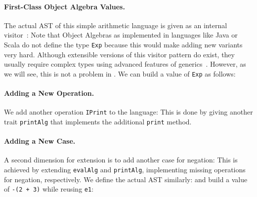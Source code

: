 \paragraph{First-Class Object Algebra Values.}
The actual AST of this simple arithmetic language is given as an internal
visitor~\cite{Oliveira_2008}:
Note that Object Algebras as implemented in languages like Java or Scala do not define the type
\lstinline{Exp} because this would make adding new variants very hard. Although extensible versions
of this visitor pattern do exist, they usually require complex types using advanced features of
generics~\cite{oliveira2012extensibility, togersen:2004}.
However, as we will see, this is not a problem in \sedel. We can build a value of \lstinline{Exp} as follows:


\paragraph{Adding a New Operation.}
We add another operation \lstinline{IPrint} to the language:
This is done by giving another trait \lstinline{printAlg} that implements the
additional \lstinline{print} method.


\paragraph{Adding a New Case.}
A second dimension for extension is to add another case for negation:
This is achieved by extending \lstinline{evalAlg} and \lstinline{printAlg}, implementing
missing operations for negation, respectively. We define the actual AST similarly:
and build a value of \lstinline{-(2 + 3)} while reusing \lstinline{e1}:

